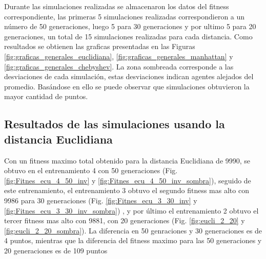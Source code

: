 \documentclass[lettersize, journal]{IEEEtran}
\begin{document}
Durante las simulaciones realizadas se almacenaron los datos del fitness correspondiente, las primeras 5 simulaciones realizadas correspondieron a un número de 50 generaciones, luego 5 para 30 generaciones y por ultimo 5 para 20 generaciones, un total de 15 simulaciones realizadas para cada distancia.
Como resultados se obtienen las graficas presentadas en las Figuras \ref{fig:graficas_generales_euclidiana}, \ref{fig:graficas_generales_manhattan} y \ref{fig:graficas_generales_chebyshev}. La zona sombreada corresponde a las desviaciones de cada simulación, estas desviaciones indican agentes alejados del promedio. Basándose en ello se puede observar que simulaciones obtuvieron la mayor cantidad de puntos.

\subsection{Resultados de las simulaciones usando la distancia Euclidiana}
Con un fitness maximo total obtenido para la distancia Euclidiana de 9990, se obtuvo en el entrenamiento 4 con 50 generaciones (Fig. \ref{fig:Fitnes_ecu_4_50_inv} y \ref{fig:Fitnes_ecu_4_50_inv_sombra}), seguido de este entrenamiento, el entrenamiento 3 obtuvo el segundo fitness mas alto con 9986 para 30 generaciones (Fig. \ref{fig:Fitnes_ecu_3_30_inv} y \ref{fig:Fitnes_ecu_3_30_inv_sombra})
, y por último el entrenamiento 2 obtuvo el tercer fitness mas alto con 9881, con 20 generaciones (Fig. \ref{fig:eucli_2_20} y \ref{fig:eucli_2_20_sombra}). La diferencia en 50 genraciones y 30 generaciones es de 4 puntos, mientras que la diferencia del fitness maximo para las 50 generaciones y 20 generaciones es de 109 puntos


\end{document}
